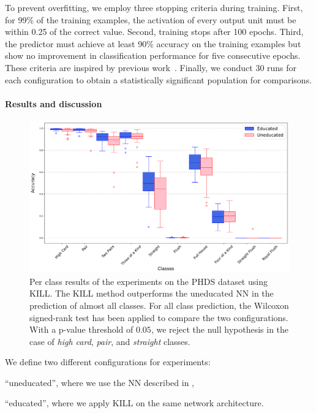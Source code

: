 To prevent overfitting, we employ three stopping criteria during training.
%
First, for 99\% of the training examples, the activation of every output unit must be within 0.25 of the correct value.
%
Second, training stops after 100 epochs.
%
Third, the predictor must achieve at least 90\% accuracy on the training examples but show no improvement in classification performance for five consecutive epochs.
%
These criteria are inspired by previous work~\cite{DBLP:conf/aaai/TowellSN90}.
%
Finally, we conduct 30 runs for each configuration to obtain a statistically significant population for comparisons.


\paragraph{Results and discussion}\label{par:phds-results}
%

%
\begin{figure}
    \centering
    \includegraphics[width=\linewidth]{figures/phds-kill-results}
    \caption[PHDS KILL results]{
        Per class results of the experiments on the \gls{PHDS} dataset using \gls{KILL}.
        The \gls{KILL} method outperforms the uneducated \gls{NN} in the prediction of almost all classes.
        For all class prediction, the Wilcoxon signed-rank test has been applied to compare the two configurations.
        With a p-value threshold of $0.05$, we reject the null hypothesis in the case of \emph{high card}, \emph{pair}, and \emph{straight} classes.
    }
    \label{fig:phds-kill-results}
\end{figure}
%
We define two different configurations for experiments:
%
\begin{inlinelist}
    \item ``uneducated'', where we use the \gls{NN} described in ,
    \item ``educated'', where we apply \gls{KILL} on the same network architecture.
\end{inlinelist}
